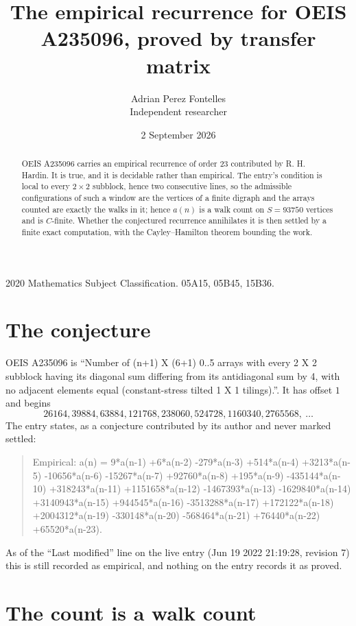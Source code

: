 \documentclass[11pt,a4paper]{article}
\title{The empirical recurrence for OEIS A235096, proved by transfer matrix}
\author{Adrian Perez Fontelles\\ \small Independent researcher}
\date{2 September 2026}
\theoremstyle{plain}
\theoremstyle{definition}
\begin{document}
\maketitle

\begin{abstract}
OEIS A235096 carries an empirical recurrence of order $23$ contributed by R. H. Hardin. It is
true, and it is decidable rather than empirical. The entry's condition is local to every $2\times2$ subblock, hence two consecutive lines, so
the admissible configurations of such a window are the vertices of a finite digraph and the
arrays counted are exactly the walks in it; hence $a(n)$ is a walk count on $S=93750$ vertices
and is $C$-finite. Whether the conjectured recurrence annihilates it is then settled by a
finite exact computation, with the Cayley--Hamilton theorem bounding the work.
\end{abstract}

\noindent\small 2020 Mathematics Subject Classification. 05A15, 05B45, 15B36.\normalsize

\section{The conjecture}

OEIS A235096 is ``Number of (n+1) X (6+1) 0..5 arrays with every 2 X 2 subblock having its diagonal sum differing from its antidiagonal sum by 4, with no adjacent elements equal (constant-stress tilted 1 X 1 tilings).''. It has offset $1$ and begins
\[
26164, 39884, 63884, 121768, 238060, 524728, 1160340, 2765568,\ \dots
\]
The entry states, as a conjecture contributed by its author and never marked settled:
\begin{quote}
Empirical: a(n) = 9*a(n-1) +6*a(n-2) -279*a(n-3) +514*a(n-4) +3213*a(n-5) -10656*a(n-6) -15267*a(n-7) +92760*a(n-8) +195*a(n-9) -435144*a(n-10) +318243*a(n-11) +1151658*a(n-12) -1467393*a(n-13) -1629840*a(n-14) +3140943*a(n-15) +944545*a(n-16) -3513288*a(n-17) +172122*a(n-18) +2004312*a(n-19) -330148*a(n-20) -568464*a(n-21) +76440*a(n-22) +65520*a(n-23).
\end{quote}
As of the ``Last modified'' line on the live entry (Jun 19 2022 21:19:28, revision 7) this is still
recorded as empirical, and nothing on the entry records it as proved.

\section{The count is a walk count}
\end{document}
